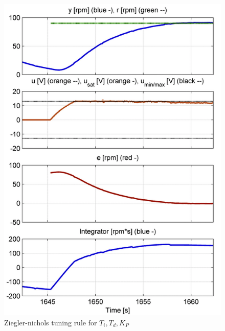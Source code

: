 \begin{figure}[H]
\begin{center}
\includegraphics[width=0.6\linewidth]{images/general//PID/Chien_Hrones_Reswick}
\end{center}
\caption{Ziegler-nichols tuning rule for $T_{i}, T_{d},K_{P}$}
\label{fig:Chien_Hrones_Reswick}
\end{figure}